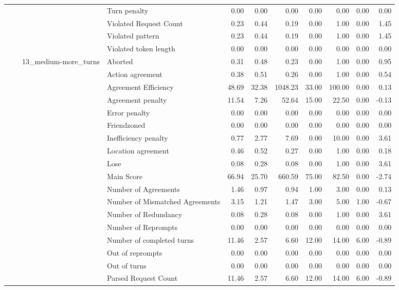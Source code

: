 \begin{tabular}{llllrrrrrrr}
 &  &  & Turn penalty & 0.00 & 0.00 & 0.00 & 0.00 & 0.00 & 0.00 & 0.00 \\
 &  &  & Violated Request Count & 0.23 & 0.44 & 0.19 & 0.00 & 1.00 & 0.00 & 1.45 \\
 &  &  & Violated pattern & 0.23 & 0.44 & 0.19 & 0.00 & 1.00 & 0.00 & 1.45 \\
 &  &  & Violated token length & 0.00 & 0.00 & 0.00 & 0.00 & 0.00 & 0.00 & 0.00 \\
\cline{3-11}
 &  & \multirow[t]{27}{*}{13_medium-more_turns} & Aborted & 0.31 & 0.48 & 0.23 & 0.00 & 1.00 & 0.00 & 0.95 \\
 &  &  & Action agreement & 0.38 & 0.51 & 0.26 & 0.00 & 1.00 & 0.00 & 0.54 \\
 &  &  & Agreement Efficiency & 48.69 & 32.38 & 1048.23 & 33.00 & 100.00 & 0.00 & 0.13 \\
 &  &  & Agreement penalty & 11.54 & 7.26 & 52.64 & 15.00 & 22.50 & 0.00 & -0.13 \\
 &  &  & Error penalty & 0.00 & 0.00 & 0.00 & 0.00 & 0.00 & 0.00 & 0.00 \\
 &  &  & Friendzoned & 0.00 & 0.00 & 0.00 & 0.00 & 0.00 & 0.00 & 0.00 \\
 &  &  & Inefficiency penalty & 0.77 & 2.77 & 7.69 & 0.00 & 10.00 & 0.00 & 3.61 \\
 &  &  & Location agreement & 0.46 & 0.52 & 0.27 & 0.00 & 1.00 & 0.00 & 0.18 \\
 &  &  & Lose & 0.08 & 0.28 & 0.08 & 0.00 & 1.00 & 0.00 & 3.61 \\
 &  &  & Main Score & 66.94 & 25.70 & 660.59 & 75.00 & 82.50 & 0.00 & -2.74 \\
 &  &  & Number of Agreements & 1.46 & 0.97 & 0.94 & 1.00 & 3.00 & 0.00 & 0.13 \\
 &  &  & Number of Mismatched Agreements & 3.15 & 1.21 & 1.47 & 3.00 & 5.00 & 1.00 & -0.67 \\
 &  &  & Number of Redundancy & 0.08 & 0.28 & 0.08 & 0.00 & 1.00 & 0.00 & 3.61 \\
 &  &  & Number of Reprompts & 0.00 & 0.00 & 0.00 & 0.00 & 0.00 & 0.00 & 0.00 \\
 &  &  & Number of completed turns & 11.46 & 2.57 & 6.60 & 12.00 & 14.00 & 6.00 & -0.89 \\
 &  &  & Out of reprompts & 0.00 & 0.00 & 0.00 & 0.00 & 0.00 & 0.00 & 0.00 \\
 &  &  & Out of turns & 0.00 & 0.00 & 0.00 & 0.00 & 0.00 & 0.00 & 0.00 \\
 &  &  & Parsed Request Count & 11.46 & 2.57 & 6.60 & 12.00 & 14.00 & 6.00 & -0.89 \\

\end{tabular}
